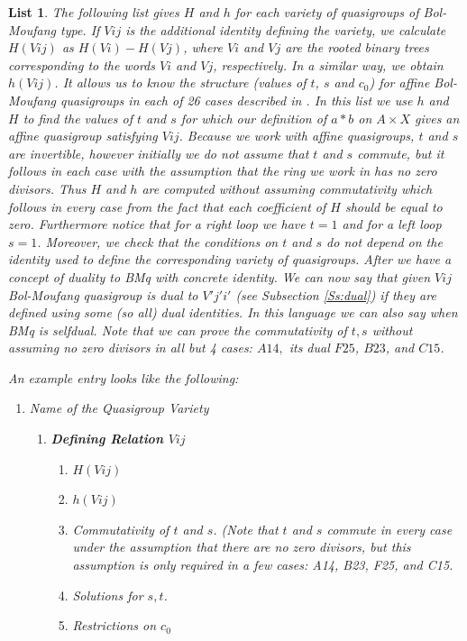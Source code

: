 \documentclass[11pt]{amsart}
\newtheorem{List}[theorem]{List}
\theoremstyle{definition}
\begin{document}

\fi


\begin{List}\label{list}
    The following list gives $H$ and $h$ for each variety of quasigroups of Bol-Moufang type. If $Vij$ is the additional identity defining the variety, we calculate $H(Vij)$ as $H(Vi)-H(Vj)$, where $Vi$ and $Vj$ are the rooted binary trees corresponding to the words $Vi$ and $Vj$, respectively. In a similar way, we obtain $h(Vij)$. It allows us to know the structure (values of $t$, $s$ and $c_0$) for affine Bol-Moufang quasigroups in each of 26 cases described in \cite{PhVo1}. In this list we use $h$ and $H$ to find the values of $t$ and $s$ for which our definition of $a * b$ on $A \times X$ gives an affine quasigroup satisfying $Vij$. Because we work with affine quasigroups, $t$ and $s$ are invertible, however initially we do not assume that $t$ and $s$ commute, but it follows in each case with the assumption that the ring we work in has no zero divisors. Thus $H$ and $h$ are  computed without assuming commutativity which follows in every case from the fact that each coefficient of $H$ should be equal to zero.
    Furthermore notice that for a right loop we have $t=1$ and for a left loop $s=1$.
    Moreover, we check that the conditions on $t$ and $s$ do not depend on the identity used to define the corresponding variety of quasigroups.
     After \cite{PhVo1} we have a concept of duality to BMq with concrete identity. We can now say that given $Vij$ Bol-Moufang quasigroup is dual to $V'j'i'$ (see Subsection \ref{Ss:dual}) if they are defined using some (so all) dual identities. In this language we can also say when BMq is selfdual. Note that we can prove the commutativity of $t,s$ without assuming no zero divisors in all but 4 cases: $A14,$ its dual $ F25$, $B23$, and $C15$. 

\bigskip

An example entry looks like the following:
     \begin{enumerate}
        \item[(1)] Name of the Quasigroup Variety
        \begin{enumerate}
            \item \textbf{Defining Relation $Vij$}
            \begin{enumerate}
                \item $H(Vij)$
                \item $h(Vij)$
                \item Commutativity of $t$ and $s$. (Note that $t$ and $s$ commute in every case under the assumption that there are no zero divisors, but this assumption is only \textit{required} in a few cases: A14, B23, F25, and C15.
                \item Solutions for $s,t$.
                \item Restrictions on $c_0$
            \end{enumerate}
        \end{enumerate}
    \end{enumerate}
\end{List}
\end{document}
